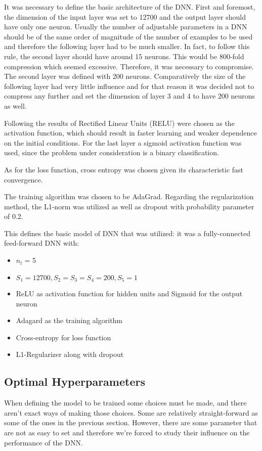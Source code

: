 It was necessary to define the basic architecture of the DNN. First and foremost, the dimension of the input layer was set to 12700 and the output layer should have only one neuron.
Usually the number of adjustable parameters in a DNN should be of the same order of magnitude of the number of examples to be used and therefore the following layer had to be much smaller. In fact, to follow this rule, the second layer should have around 15 neurons. This would be 800-fold compression which seemed excessive. Therefore, it was necessary to compromise. The second layer was defined with 200 neurons. Comparatively the size of the following layer had very little influence and for that reason it was decided not to compress any further and set the dimension of layer 3 and 4 to have 200 neurons as well. 

Following the results of \cite{glorot2011deep} Rectified Linear Units (RELU) were chosen as the activation function, which should result in faster learning and weaker dependence on the initial conditions. For the last layer a sigmoid activation function was used, since the problem under consideration is a binary classification.

As for the loss function, cross entropy was chosen given its characteristic fast convergence.

The training algorithm was chosen to be AdaGrad.
Regarding the regularization method, the L1-norm was utilized as well as dropout with probability parameter of 0.2.

This defines the basic model of DNN that was utilized: it was a fully-connected feed-forward DNN with:
\begin{itemize}
\item $n_l$ = 5
\item $S_1 = 12700, S_2=S_3=S_4 = 200, S_5=1$
\item ReLU as activation function for hidden units and Sigmoid for the output neuron
\item Adagard as the training algorithm
\item Cross-entropy for loss function
\item L1-Regularizer along with dropout
\end{itemize}

\subsection{Optimal Hyperparameters}
\label{subsec:hyperparameters}

When defining the model to be trained some choices must be made, and there aren't exact ways of making those choices. Some are relatively straight-forward as some of the ones in the previous section. However, there are some parameter that are not as easy to set and therefore we're forced to study their influence on the performance of the DNN.

